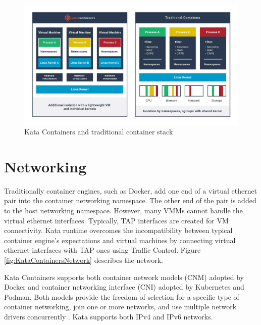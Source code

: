 \begin{figure}[ht]
  \begin{center}
    \includegraphics[width=13.5cm]{images/KataContainersStack.jpg}
    \caption{Kata Containers and traditional container stack \cite{KataContainers}}
    \label{fig:KataContainersStack}
  \end{center}
\end{figure} 

\section{Networking}

Traditionally container engines, such as Docker, add one end of a virtual ethernet pair into the container networking namespace. The other end of the pair is added to the host networking namespace. However, many VMMs cannot handle the virtual ethernet interfaces. Typically, TAP interfaces are created for VM connectivity. Kata runtime overcomes the incompatibility between typical container engine's expectations and virtual machines by connecting virtual ethernet interfaces with TAP ones using Traffic Control. Figure \ref{fig:KataContainersNetwork} describes the network. \cite{KataContainersArchitecture}


Kata Containers supports both container network models (CNM) adopted by Docker and container networking interface (CNI) \cite{CNI} adopted by Kubernetes and Podman. Both models provide the freedom of selection for a specific type of container networking, join one or more networks, and use multiple network drivers concurrently \cite{Randazzo2019}. Kata supports both IPv4 and IPv6 networks.

